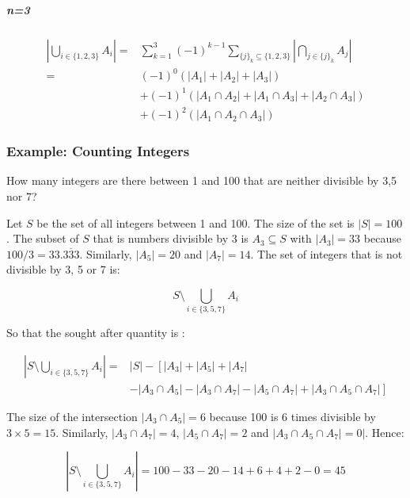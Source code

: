 \subparagraph{n=3}
\begin{equation}
\begin{array}{rl}
\left|\bigcup_{i\in\{1,2,3\}}A_i\right| =&  \sum^3_{k=1} (-1)^{k-1} \sum_{\{j\}_k \subseteq \{1,2,3\}} \left|\bigcap_{j\in\{j\}_k} A_j\right|\\
=&(-1)^{0}\left(|A_1| + |A_2| + |A_3|\right) \\
&+ (-1)^{1}\left(|A_1 \cap A_2|  + |A_1 \cap A_3| + |A_2 \cap A_3|  \right) \\ 
&+ (-1)^{2}\left(|A_1 \cap A_2 \cap A_3|   \right)
\end{array}
\end{equation}

\subsubsection{Example: Counting Integers}

How many integers are there between 1 and 100 that are neither divisible by 3,5 nor 7?

Let $S$ be the set of all integers between 1 and 100. The size of the set is $|S| = 100$. The subset of $S$ that is numbers divisible by 3 is $A_3 \subseteq S$ with $|A_3| = 33$ because $100/3 = 33.\overline{333}$. Similarly, $|A_5| = 20$ and $|A_7| = 14$.  The set of integers that is not divisible by 3, 5 or 7 is:

\begin{equation}
S \setminus \bigcup_{i\in\{3,5,7\}} A_i
\end{equation}

So that the sought after quantity is :

\begin{equation}
\begin{array}{rl}
\left|S \setminus \bigcup_{i\in\{3,5,7\}} A_i\right| =& |S| - \left[ |A_3| + |A_5| + |A_7| \right.\\
& \left. - |A_3 \cap A_5| - |A_3 \cap A_7| - |A_5\cap A_7| + |A_3\cap A_5\cap A_7|\right]
\end{array}
\end{equation}

The size of the intersection $|A_3\cap A_5| = 6$ because 100 is 6 times divisible by $3\times 5 = 15$. Similarly, $|A_3 \cap A_7| =  4$, $|A_5 \cap A_7| =  2$ and $|A_3\cap A_5 \cap A_7| =  0|$. Hence:

\begin{equation}
\left|S \setminus \bigcup_{i\in\{3,5,7\}} A_i\right| = 100 - 33 - 20 - 14 + 6 + 4 + 2 - 0 = 45
\end{equation}


